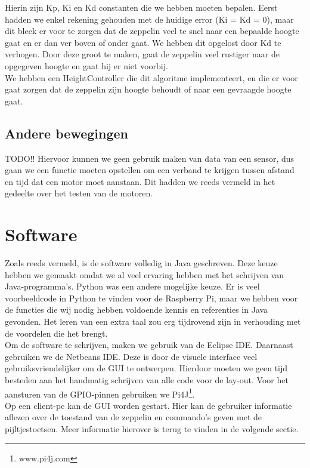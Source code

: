 \documentclass[eind]{penoverslag}
\begin{document}
Hierin zijn Kp, Ki en Kd constanten die we hebben moeten bepalen. Eerst hadden we enkel rekening gehouden met de huidige error (Ki = Kd = 0), maar dit bleek er voor te zorgen dat de zeppelin veel te snel naar een bepaalde hoogte gaat en er dan ver boven of onder gaat. We hebben dit opgelost door Kd te verhogen. Door deze groot te maken, gaat de zeppelin veel rustiger naar de opgegeven hoogte en gaat hij er niet voorbij. \\

We hebben een HeightController die dit algoritme implementeert, en die er voor gaat zorgen dat de zeppelin zijn hoogte behoudt of naar een gevraagde hoogte gaat.

\subsection{Andere bewegingen}
TODO!!
Hiervoor kunnen we geen gebruik maken van data van een sensor, dus gaan we een functie moeten opstellen om een verband te krijgen tussen afstand en tijd dat een motor moet aanstaan. Dit hadden we reeds vermeld in het gedeelte over het testen van de motoren. \\

\section{Software}
Zoals reeds vermeld, is de software volledig in Java geschreven. Deze keuze hebben we gemaakt omdat we al veel ervaring hebben met het schrijven van Java-programma's. Python was een andere mogelijke keuze. Er is veel voorbeeldcode in Python te vinden voor de Raspberry Pi, maar we hebben voor de functies die wij nodig hebben voldoende kennis en referenties in Java gevonden. Het leren van een extra taal zou erg tijdrovend zijn in verhouding met de voordelen die het brengt. \\

Om de software te schrijven, maken we gebruik van de Eclipse IDE. Daarnaast gebruiken we de Netbeans IDE. Deze is door de visuele interface veel gebruiksvriendelijker om de GUI te ontwerpen. Hierdoor moeten we geen tijd besteden aan het handmatig schrijven van alle code voor de lay-out. Voor het aansturen van de GPIO-pinnen gebruiken we Pi4J\footnote{www.pi4j.com}.\\

Op een client-pc kan de GUI worden gestart. Hier kan de gebruiker informatie aflezen over de toestand van de zeppelin en commando's geven met de pijltjestoetsen. Meer informatie hierover is terug te vinden in de volgende sectie. \\
\end{document}

